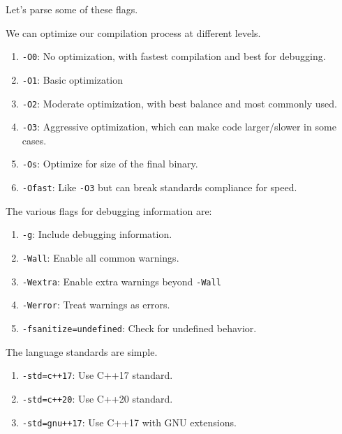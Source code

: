 \documentclass{article}
\newcounter{definition}[section]
\newcounter{code}[section]
\begin{document}
      Let's parse some of these flags. 

      \begin{definition}
        \label{def:optimization-flags}
        We can optimize our compilation process at different levels. 
        \begin{enumerate}
          \item \texttt{-O0}: No optimization, with fastest compilation and best for debugging. 
          \item \texttt{-O1}: Basic optimization 
          \item \texttt{-O2}: Moderate optimization, with best balance and most commonly used. 
          \item \texttt{-O3}: Aggressive optimization, which can make code larger/slower in some cases. 
          \item \texttt{-Os}: Optimize for size of the final binary. 
          \item \texttt{-Ofast}: Like \texttt{-O3} but can break standards compliance for speed. 
        \end{enumerate}
      \end{definition}

      \begin{definition}
        \label{def:debugging-flags}
        The various flags for debugging information are: 
        \begin{enumerate}
          \item \texttt{-g}: Include debugging information. 
          \item \texttt{-Wall}: Enable all common warnings. 
          \item \texttt{-Wextra}: Enable extra warnings beyond \texttt{-Wall} 
          \item \texttt{-Werror}: Treat warnings as errors. 
          \item \texttt{-fsanitize=undefined}: Check for undefined behavior. 
        \end{enumerate}
      \end{definition} 

      \begin{definition}
        \label{def:language-standards}
        The language standards are simple. 
        \begin{enumerate}
          \item \texttt{-std=c++17}: Use C++17 standard. 
          \item \texttt{-std=c++20}: Use C++20 standard. 
          \item \texttt{-std=gnu++17}: Use C++17 with GNU extensions. 
        \end{enumerate}
      \end{definition}
\end{document}
